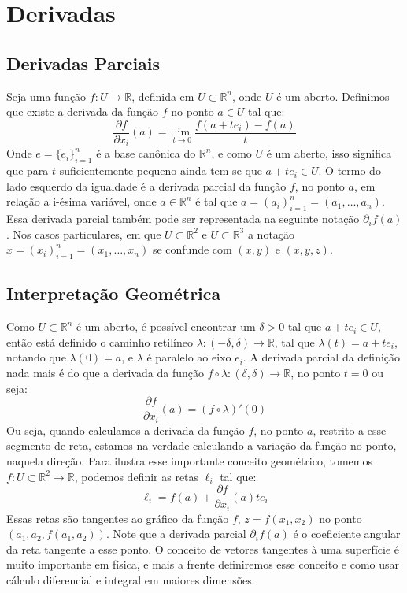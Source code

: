 \section{Derivadas}


\subsection{Derivadas Parciais}

Seja uma função $f:U\to\mathbb{R}$, definida em $U\subset\mathbb{R}^n$, onde $U$ é um aberto. Definimos que existe a derivada da função $f$ no ponto $a \in U$ tal que:
%
%
\[ 
\frac{\partial f}{\partial x_i}(a) = \lim_{t\to 0}\frac{f(a + t e_i) 
- f(a)}{t}
\]
%
%
Onde $e = \{e_i\}_{i=1}^{n}$ é a base canônica do $\mathbb{R}^n$, e como $U$ é um aberto, isso significa que para $t$ suficientemente pequeno ainda tem-se que $a + te_i \in U$. O termo do lado esquerdo da igualdade é a derivada parcial da função $f$, no ponto $a$, em relação a i-ésima variável, onde $a\in\mathbb{R}^n$ é tal que $a = (a_i)_{i=1}^{n} = (a_1,\ldots,a_n)$. Essa derivada parcial também pode ser representada na seguinte notação $\partial_{i}f(a)$. Nos casos particulares, em que $U \subset \mathbb{R}^2$ e $U \subset \mathbb{R}^3$ a notação $x = (x_i)_{i=1}^{n} = (x_1,\ldots,x_n)$ 
se confunde com $(x,y)$ e $(x,y,z)$.



\subsection{Interpretação Geométrica}


Como $U\subset\mathbb{R}^n$ é um aberto, é possível encontrar um $\delta > 0$ tal que $a+te_i \in U$, então está definido o caminho retilíneo $\lambda:(-\delta,\delta) \to \mathbb{R}$, tal que $\lambda(t) = a + te_i$, notando que $\lambda(0) = a$, e $\lambda$ é paralelo ao eixo $e_i$. A derivada parcial da definição nada mais é do que a derivada da função $f \circ \lambda:(\delta,\delta)\to\mathbb{R}$, no ponto $t=0$ ou seja:
%
\[
\frac{\partial f}{\partial x_i}(a) = (f \circ \lambda)'(0) 
\]
%
%
Ou seja, quando calculamos a derivada da função $f$, no ponto $a$, restrito a esse segmento de reta, estamos na verdade calculando a variação da função no ponto, naquela direção. Para ilustra esse importante conceito geométrico, tomemos $f:U\subset\mathbb{R}^2\to\mathbb{R}$, podemos definir as retas 
$\ell_i$ tal que:
%
%
\[
\ell_i = f(a) + \frac{\partial f}{\partial x_i}(a)t e_i
\]
%
%
Essas retas são tangentes ao gráfico da função $f$, $z = f(x_1,x_2)$ no ponto $(a_1,a_2,f(a_1,a_2))$. Note que a derivada parcial $\partial_i f(a)$ é o coeficiente angular da reta tangente a esse ponto. O conceito de vetores tangentes à uma superfície é muito importante em física, e mais a frente definiremos esse conceito e como usar cálculo diferencial e integral em maiores dimensões.


